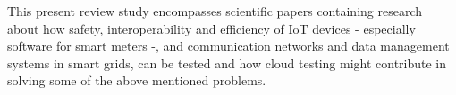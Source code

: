 This present review study encompasses scientific papers containing research about how safety, interoperability and efficiency of IoT devices - especially software for smart meters -, and communication networks and data management systems in smart grids, can be tested and how cloud testing might contribute in solving some of the above mentioned problems.
